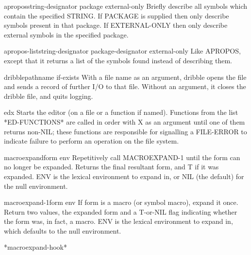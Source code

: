 \documentclass[10pt,english]{book}
\begin{document}
\begin{function}{apropos}{string-designator \op package external-only}
  Briefly describe all symbols which contain the specified STRING.
  If PACKAGE is supplied then only describe symbols present in
  that package. If EXTERNAL-ONLY then only describe
  external symbols in the specified package.
\end{function}

\begin{function}{apropos-list}{string-designator \op package-designator external-only}
  Like APROPOS, except that it returns a list of the symbols found instead
  of describing them.
\end{function}

\begin{function}{dribble}{\op pathname \key if-exists}
  With a file name as an argument, dribble opens the file and sends a
  record of further I/O to that file. Without an argument, it closes
  the dribble file, and quits logging.
\end{function}

\begin{function}{ed}{\op x}
  Starts the editor (on a file or a function if named).  Functions
from the list *ED-FUNCTIONS* are called in order with X as an argument
until one of them returns non-NIL; these functions are responsible for
signalling a FILE-ERROR to indicate failure to perform an operation on
the file system.
\end{function}

\begin{function}{macroexpand}{form \op env}
  Repetitively call MACROEXPAND-1 until the form can no longer be expanded.
   Returns the final resultant form, and T if it was expanded. ENV is the
   lexical environment to expand in, or NIL (the default) for the null
   environment.
\end{function}

\begin{function}{macroexpand-1}{form \op env}
  If form is a macro (or symbol macro), expand it once. Return two values,
   the expanded form and a T-or-NIL flag indicating whether the form was, in
   fact, a macro. ENV is the lexical environment to expand in, which defaults
   to the null environment.
\end{function}

\begin{variable}{*macroexpand-hook*}{}
  
\end{variable}
\end{document}
